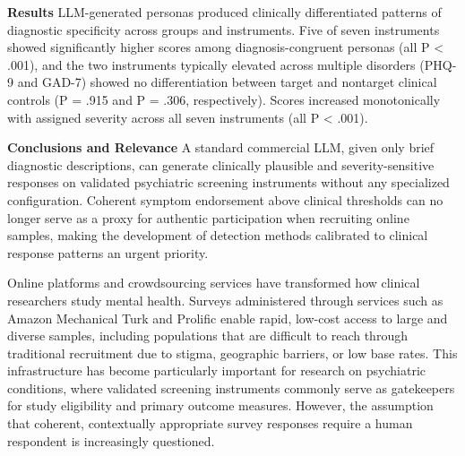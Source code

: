 \documentclass[12pt]{article}
\begin{document}
\begin{flushleft}
\vspace{0.5em}

\textbf{Results\hspace{1em}} LLM-generated personas produced clinically differentiated patterns of diagnostic specificity across groups and instruments. Five of seven instruments showed significantly higher scores among diagnosis-congruent personas (all P < .001), and the two instruments typically elevated across multiple disorders (PHQ-9 and GAD-7) showed no differentiation between target and nontarget clinical controls (P = .915 and P = .306, respectively). Scores increased monotonically with assigned severity across all seven instruments (all P < .001).

\vspace{0.5em}

\textbf{Conclusions and Relevance\hspace{1em}} A standard commercial LLM, given only brief diagnostic descriptions, can generate clinically plausible and severity-sensitive responses on validated psychiatric screening instruments without any specialized configuration. Coherent symptom endorsement above clinical thresholds can no longer serve as a proxy for authentic participation when recruiting online samples, making the development of detection methods calibrated to clinical response patterns an urgent priority.

\end{flushleft}

\newpage


Online platforms and crowdsourcing services have transformed how clinical researchers study mental health.\cite{gillan2021} Surveys administered through services such as Amazon Mechanical Turk and Prolific enable rapid, low-cost access to large and diverse samples, including populations that are difficult to reach through traditional recruitment due to stigma, geographic barriers, or low base rates.\cite{chandler2016} This infrastructure has become particularly important for research on psychiatric conditions, where validated screening instruments commonly serve as gatekeepers for study eligibility and primary outcome measures. However, the assumption that coherent, contextually appropriate survey responses require a human respondent is increasingly questioned.
\end{document}
